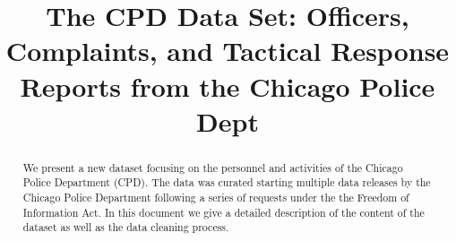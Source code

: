 \documentclass{article}
\title{The CPD Data Set: Officers, Complaints, and Tactical Response Reports from the Chicago Police Dept}
\begin{document}
\maketitle

\begin{abstract}
	We present a new dataset focusing on the personnel and activities of the
	Chicago Police Department (CPD). The data was curated starting multiple
	data releases by the Chicago Police Department following a series of
	requests under the the Freedom of Information Act. In this document we give
	a detailed description of the content of the dataset as well as the data
	cleaning process.
\end{abstract}










\end{document}
